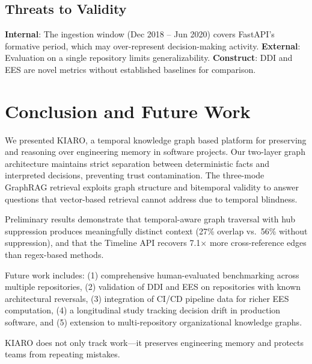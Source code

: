 \documentclass[conference]{IEEEtran}
\begin{document}
\subsection{Threats to Validity}
\textbf{Internal}: The ingestion window (Dec 2018 -- Jun 2020) covers FastAPI's formative period, which may over-represent decision-making activity. \textbf{External}: Evaluation on a single repository limits generalizability. \textbf{Construct}: DDI and EES are novel metrics without established baselines for comparison.

\section{Conclusion and Future Work}
\label{sec:conclusion}

We presented KIARO, a temporal knowledge graph based platform for preserving and reasoning over engineering memory in software projects. Our two-layer graph architecture maintains strict separation between deterministic facts and interpreted decisions, preventing trust contamination. The three-mode GraphRAG retrieval exploits graph structure and bitemporal validity to answer questions that vector-based retrieval cannot address due to temporal blindness.

Preliminary results demonstrate that temporal-aware graph traversal with hub suppression produces meaningfully distinct context (27\% overlap vs.\ 56\% without suppression), and that the Timeline API recovers 7.1$\times$ more cross-reference edges than regex-based methods.

Future work includes: (1) comprehensive human-evaluated benchmarking across multiple repositories, (2) validation of DDI and EES on repositories with known architectural reversals, (3) integration of CI/CD pipeline data for richer EES computation, (4) a longitudinal study tracking decision drift in production software, and (5) extension to multi-repository organizational knowledge graphs.

KIARO does not only track work---it preserves engineering memory and protects teams from repeating mistakes.
\end{document}
